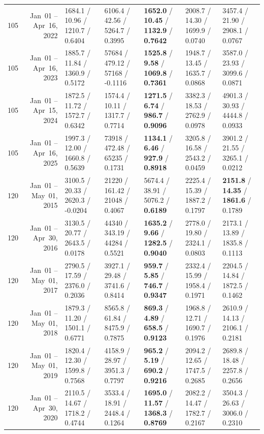\begin{longtable}{r r l l l l l}
105 & Jan~01 -- Apr~16, 2022 & 1684.1 / 10.96 / 1210.7 / 0.6404 & 6106.4 / 42.56 / 5264.7 / 0.3995 & \textbf{1652.0} / \textbf{10.45} / \textbf{1132.9} / \textbf{0.7642} & 2008.7 / 14.30 / 1699.9 / 0.0740 & 3457.4 / 21.90 / 2908.1 / 0.0767 \\
105 & Jan~01 -- Apr~16, 2023 & 1885.7 / 11.84 / 1360.9 / 0.5172 & 57684 / 479.12 / 57168 / -0.1116 & \textbf{1525.8} / \textbf{9.58} / \textbf{1069.8} / \textbf{0.7361} & 1948.7 / 13.45 / 1635.7 / 0.0868 & 3587.0 / 23.93 / 3099.6 / 0.0871 \\
105 & Jan~01 -- Apr~15, 2024 & 1872.5 / 11.72 / 1572.7 / 0.6342 & 1574.4 / 10.11 / 1317.7 / 0.7714 & \textbf{1271.5} / \textbf{6.74} / \textbf{986.7} / \textbf{0.9096} & 3382.3 / 18.53 / 2762.9 / 0.0978 & 4901.3 / 30.93 / 4444.8 / 0.0933 \\
105 & Jan~01 -- Apr~16, 2025 & 1997.3 / 12.00 / 1660.8 / 0.5639 & 73918 / 472.48 / 65235 / 0.1731 & \textbf{1134.1} / \textbf{6.46} / \textbf{927.9} / \textbf{0.8918} & 3205.8 / 16.58 / 2543.2 / 0.0459 & 3901.2 / 21.55 / 3265.1 / 0.0212 \\
\midrule
120 & Jan~01 -- May~01, 2015 & 3100.5 / 20.33 / 2620.3 / -0.0204 & 21220 / 161.42 / 21048 / 0.4067 & 5674.4 / 38.91 / 5076.2 / \textbf{0.6189} & 2225.4 / 15.39 / 1887.2 / 0.1797 & \textbf{2151.8} / \textbf{14.35} / \textbf{1861.6} / 0.1789 \\
120 & Jan~01 -- Apr~30, 2016 & 3130.5 / 20.77 / 2643.5 / 0.0178 & 44340 / 343.19 / 44284 / 0.5521 & \textbf{1635.2} / \textbf{9.66} / \textbf{1282.5} / \textbf{0.9040} & 2778.0 / 19.80 / 2324.1 / 0.0803 & 2173.1 / 13.89 / 1835.8 / 0.1113 \\
120 & Jan~01 -- May~01, 2017 & 2790.5 / 17.59 / 2376.0 / 0.2036 & 3927.1 / 29.48 / 3741.6 / 0.8414 & \textbf{959.7} / \textbf{5.85} / \textbf{746.7} / \textbf{0.9347} & 2332.4 / 15.99 / 1958.4 / 0.1971 & 2204.5 / 14.84 / 1872.5 / 0.1462 \\
120 & Jan~01 -- May~01, 2018 & 1879.3 / 11.20 / 1501.1 / 0.6771 & 8565.8 / 61.84 / 8475.9 / 0.7875 & \textbf{869.3} / \textbf{4.89} / \textbf{658.5} / \textbf{0.9123} & 1968.8 / 12.71 / 1690.7 / 0.1976 & 2610.9 / 14.13 / 2106.1 / 0.2181 \\
120 & Jan~01 -- May~01, 2019 & 1820.4 / 12.30 / 1599.8 / 0.7568 & 4158.9 / 28.97 / 3951.3 / 0.7797 & \textbf{965.2} / \textbf{5.19} / \textbf{690.2} / \textbf{0.9216} & 2094.2 / 12.65 / 1747.5 / 0.2685 & 2689.8 / 18.48 / 2257.8 / 0.2656 \\
120 & Jan~01 -- Apr~30, 2020 & 2110.5 / 14.67 / 1718.2 / 0.4744 & 3533.4 / 18.91 / 2448.4 / 0.1264 & \textbf{1695.0} / \textbf{11.57} / \textbf{1368.3} / \textbf{0.8769} & 2082.2 / 14.47 / 1782.7 / 0.2167 & 3504.3 / 26.63 / 3006.0 / 0.2310 \\

\end{longtable}
